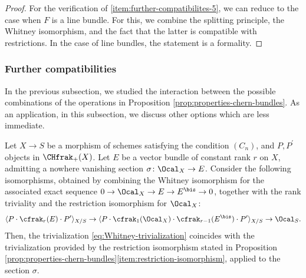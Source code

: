 \begin{proof}
For the verification of \eqref{item:further-compatibilites-5}, we can reduce to the case when $F$ is a line bundle. For this, we combine the splitting principle, the Whitney isomorphism, and the fact that the latter is compatible with restrictions. In the case of line bundles, the statement is a formality.
\end{proof}

\subsubsection{Further compatibilities}

In the previous subsection, we studied the interaction between the possible combinations of the operations in Proposition \ref{prop:properties-chern-bundles}. As an application, in this subsection, we discuss other options which are less immediate.
\begin{proposition}\label{prop:newranktriviality}
Let $X\to S$ be a morphism of schemes satisfying the condition $(C_{n})$, and $P,P^{\prime}$ objects in $\CHfrak_{+}(X)$. Let $E$ be a vector bundle of constant rank $r$ on $X$, admitting a nowhere vanishing section $\sigma\colon\Ocal_{X}\to E$. Consider the following isomorphisms, obtained by combining the Whitney isomorphism for the associated exact sequence $0\to\Ocal_{X}\to E\to E^{\bis}\to 0$, together with the rank triviality and the restriction isomorphism for $\Ocal_{X}$:
\begin{equation}\label{eq:Whitney-trivialization}
\langle P\cdot\cfrak_{r}(E)\cdot P^{\prime}\rangle_{X/S}\to\langle P\cdot\cfrak_{1}(\Ocal_{X})\cdot\cfrak_{r-1}(E^{\bis})\cdot P^{\prime}\rangle_{X/S}\to\Ocal_{S}.
\end{equation}Then, the trivialization \eqref{eq:Whitney-trivialization} coincides with the trivialization provided by the restriction isomorphism stated in Proposition \ref{prop:properties-chern-bundles}\eqref{item:restriction-isomorphism}, applied to the section $\sigma$.
\end{proposition}
